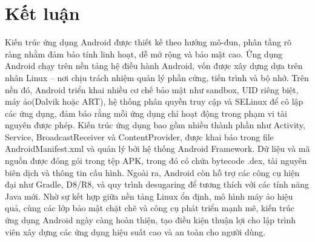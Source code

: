 \section{Kết luận}
    Kiến trúc ứng dụng Android được thiết kế theo hướng mô-đun, phân tầng rõ ràng nhằm đảm bảo tính linh hoạt, dễ mở rộng và bảo mật cao. Ứng dụng Android chạy trên nền tảng hệ điều hành Android, vốn được xây dựng dựa trên nhân Linux – nơi chịu trách nhiệm quản lý phần cứng, tiến trình và bộ nhớ. Trên nền đó, Android triển khai nhiều cơ chế bảo mật như sandbox, UID riêng biệt, máy ảo(Dalvik hoặc ART), hệ thống phân quyền truy cập và SELinux để cô lập các ứng dụng, đảm bảo rằng mỗi ứng dụng chỉ hoạt động trong phạm vi tài nguyên được phép. Kiến trúc ứng dụng bao gồm nhiều thành phần như Activity, Service, BroadcastReceiver và ContentProvider, được khai báo trong file AndroidManifest.xml và quản lý bởi hệ thống Android Framework. Dữ liệu và mã nguồn được đóng gói trong tệp APK, trong đó có chứa bytecode .dex, tài nguyên biên dịch và thông tin cấu hình. Ngoài ra, Android còn hỗ trợ các công cụ hiện đại như Gradle, D8/R8, và quy trình desugaring để tương thích với các tính năng Java mới. Nhờ sự kết hợp giữa nền tảng Linux ổn định, mô hình máy ảo hiệu quả, cùng các lớp bảo mật chặt chẽ và công cụ phát triển mạnh mẽ, kiến trúc ứng dụng Android ngày càng hoàn thiện, tạo điều kiện thuận lợi cho lập trình viên xây dựng các ứng dụng hiệu suất cao và an toàn cho người dùng.\\

